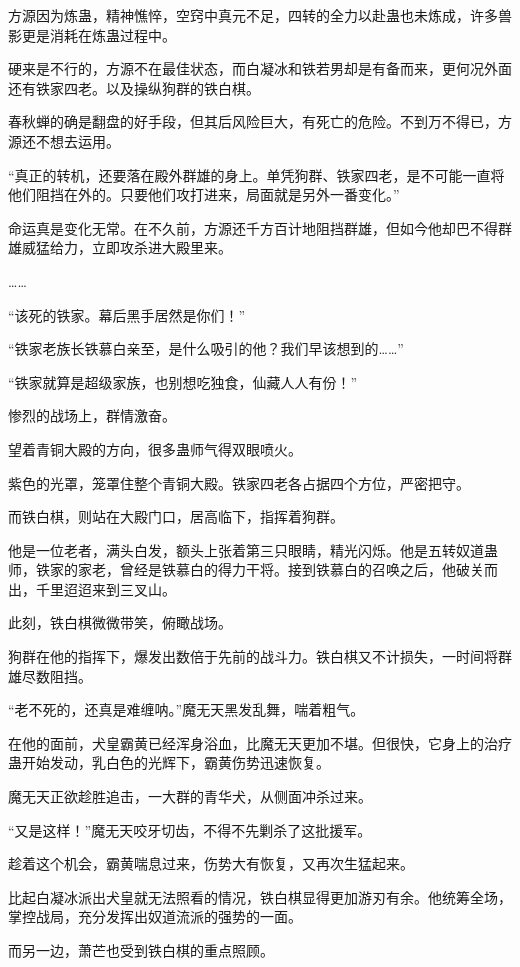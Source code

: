 \begin{this_body}
方源因为炼蛊，精神憔悴，空窍中真元不足，四转的全力以赴蛊也未炼成，许多兽影更是消耗在炼蛊过程中。

硬来是不行的，方源不在最佳状态，而白凝冰和铁若男却是有备而来，更何况外面还有铁家四老。以及操纵狗群的铁白棋。

春秋蝉的确是翻盘的好手段，但其后风险巨大，有死亡的危险。不到万不得已，方源还不想去运用。

“真正的转机，还要落在殿外群雄的身上。单凭狗群、铁家四老，是不可能一直将他们阻挡在外的。只要他们攻打进来，局面就是另外一番变化。”

命运真是变化无常。在不久前，方源还千方百计地阻挡群雄，但如今他却巴不得群雄威猛给力，立即攻杀进大殿里来。

……

“该死的铁家。幕后黑手居然是你们！”

“铁家老族长铁慕白亲至，是什么吸引的他？我们早该想到的……”

“铁家就算是超级家族，也别想吃独食，仙藏人人有份！”

惨烈的战场上，群情激奋。

望着青铜大殿的方向，很多蛊师气得双眼喷火。

紫色的光罩，笼罩住整个青铜大殿。铁家四老各占据四个方位，严密把守。

而铁白棋，则站在大殿门口，居高临下，指挥着狗群。

他是一位老者，满头白发，额头上张着第三只眼睛，精光闪烁。他是五转奴道蛊师，铁家的家老，曾经是铁慕白的得力干将。接到铁慕白的召唤之后，他破关而出，千里迢迢来到三叉山。

此刻，铁白棋微微带笑，俯瞰战场。

狗群在他的指挥下，爆发出数倍于先前的战斗力。铁白棋又不计损失，一时间将群雄尽数阻挡。

“老不死的，还真是难缠呐。”魔无天黑发乱舞，喘着粗气。

在他的面前，犬皇霸黄已经浑身浴血，比魔无天更加不堪。但很快，它身上的治疗蛊开始发动，乳白色的光辉下，霸黄伤势迅速恢复。

魔无天正欲趁胜追击，一大群的青华犬，从侧面冲杀过来。

“又是这样！”魔无天咬牙切齿，不得不先剿杀了这批援军。

趁着这个机会，霸黄喘息过来，伤势大有恢复，又再次生猛起来。

比起白凝冰派出犬皇就无法照看的情况，铁白棋显得更加游刃有余。他统筹全场，掌控战局，充分发挥出奴道流派的强势的一面。

而另一边，萧芒也受到铁白棋的重点照顾。


\end{this_body}
